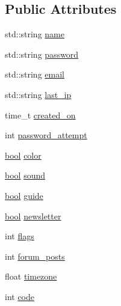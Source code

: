 \subsection*{Public Attributes}
\begin{DoxyCompactItemize}
\item 
std\-::string \hyperlink{classaccount_a783452af8647af9c866fc34500d7f3bf}{name}
\item 
std\-::string \hyperlink{classaccount_a5065b11fa126577408a795baaee55c9a}{password}
\item 
std\-::string \hyperlink{classaccount_a4162d542188272c7b0d8fa23f3cd1d8d}{email}
\item 
std\-::string \hyperlink{classaccount_ae3e0f8aeca928fac0382524f6aecd23d}{last\-\_\-ip}
\item 
time\-\_\-t \hyperlink{classaccount_a417252386b992dd5fb40e89c03da57c8}{created\-\_\-on}
\item 
int \hyperlink{classaccount_af922bcf652c2840a54d1d2fbb2bb2f31}{password\-\_\-attempt}
\item 
\hyperlink{structs_8h_ad5c9d4ba3dc37783a528b0925dc981a0}{bool} \hyperlink{classaccount_afcc62d878922a73bb9b4207682ee9308}{color}
\item 
\hyperlink{structs_8h_ad5c9d4ba3dc37783a528b0925dc981a0}{bool} \hyperlink{classaccount_abfa6841eb5aa7765512ce8ca2e15c2d5}{sound}
\item 
\hyperlink{structs_8h_ad5c9d4ba3dc37783a528b0925dc981a0}{bool} \hyperlink{classaccount_a24cfe23c99afd8e2dd1c5eb479c5099a}{guide}
\item 
\hyperlink{structs_8h_ad5c9d4ba3dc37783a528b0925dc981a0}{bool} \hyperlink{classaccount_ac79e04b34415777a4ca74fffd0999c32}{newsletter}
\item 
int \hyperlink{classaccount_a9a252c3f2ba9386ca20fc3c48bf87f43}{flags}
\item 
int \hyperlink{classaccount_acf8a77ab282ed9ba8a45bccf97cd30f8}{forum\-\_\-posts}
\item 
float \hyperlink{classaccount_a7eb216076728b85fb3ce1dc89b794f87}{timezone}
\item 
int \hyperlink{classaccount_adfc7ed36bceef7a04d39e6ba19bc001c}{code}
\end{DoxyCompactItemize}


